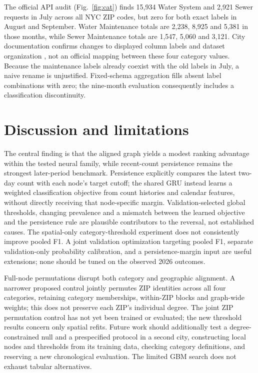 \documentclass[conference]{IEEEtran}
\begin{document}
The official API audit (Fig.~\ref{fig:cat}) finds 15,934 Water System and 2,921 Sewer requests in July across all NYC ZIP codes, but zero for both exact labels in August and September. Water Maintenance totals are 2,238, 8,925 and 5,381 in those months, while Sewer Maintenance totals are 1,547, 5,060 and 3,121. City documentation confirms changes to displayed column labels and dataset organization \cite{nycupdate}, not an official mapping between these four category values. Because the maintenance labels already coexist with the old labels in July, a naive rename is unjustified. Fixed-schema aggregation fills absent label combinations with zero; the nine-month evaluation consequently includes a classification discontinuity. 

\section{Discussion and limitations}
The central finding is that the aligned graph yields a modest ranking advantage within the tested neural family, while recent-count persistence remains the strongest later-period benchmark. Persistence explicitly compares the latest two-day count with each node's target cutoff; the shared GRU instead learns a weighted classification objective from count histories and calendar features, without directly receiving that node-specific margin. Validation-selected global thresholds, changing prevalence and a mismatch between the learned objective and the persistence rule are plausible contributors to the reversal, not established causes. The spatial-only category-threshold experiment does not consistently improve pooled F1. A joint validation optimization targeting pooled F1, separate validation-only probability calibration, and a persistence-margin input are useful extensions; none should be tuned on the observed 2026 outcomes.

Full-node permutations disrupt both category and geographic alignment. A narrower proposed control jointly permutes ZIP identities across all four categories, retaining category memberships, within-ZIP blocks and graph-wide weights; this does not preserve each ZIP's individual degree. The joint ZIP permutation control has not yet been trained or evaluated; the new threshold results concern only spatial refits. Future work should additionally test a degree-constrained null and a prespecified protocol in a second city, constructing local nodes and thresholds from its training data, checking category definitions, and reserving a new chronological evaluation. The limited GBM search does not exhaust tabular alternatives.
\end{document}
